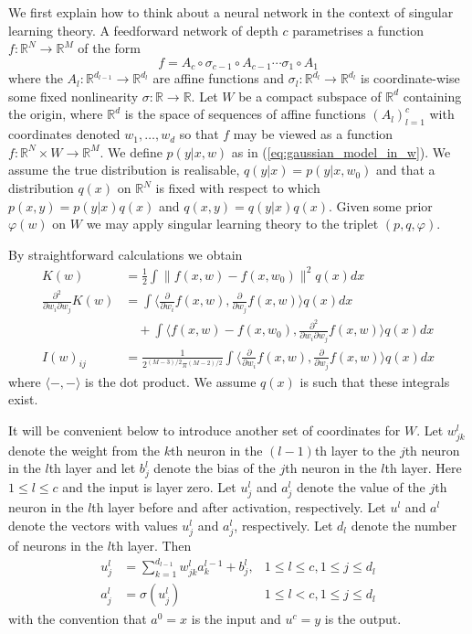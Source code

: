 \documentclass[11pt]{article}
\def\lto{\longrightarrow}
\numberwithin{equation}{section}
\theoremstyle{plain}
\theoremstyle{definition}
\begin{document}
We first explain how to think about a neural network in the context of singular learning theory. A feedforward network of depth $c$ parametrises a function $f: \mathbb{R}^N \lto \mathbb{R}^M$ of the form
\[
f = A_c \circ \sigma_{c-1} \circ A_{c-1} \cdots \sigma_1 \circ A_1
\]
where the $A_l: \mathbb{R}^{d_{l-1}} \lto \mathbb{R}^{d_{l}}$ are affine functions and $\sigma_l: \mathbb{R}^{d_{l}} \lto \mathbb{R}^{d_{l}}$ is coordinate-wise some fixed nonlinearity $\sigma: \mathbb{R} \lto \mathbb{R}$. Let $W$ be a compact subspace of $\mathbb{R}^d$ containing the origin, where $\mathbb{R}^d$ is the space of sequences of affine functions $(A_l)_{l=1}^c$ with coordinates denoted $w_1,\ldots,w_d$ so that $f$ may be viewed as a function $f: \mathbb{R}^N \times W \lto \mathbb{R}^M$. We define $p(y|x,w)$ as in (\ref{eq:gaussian_model_in_w}). We assume the true distribution is realisable, $q(y|x) = p(y|x,w_0)$ and that a distribution $q(x)$ on $\mathbb{R}^N$ is fixed with respect to which $p(x,y) = p(y|x)q(x)$ and $q(x,y) = q(y|x)q(x)$. Given some prior $\varphi(w)$ on $W$ we may apply singular learning theory to the triplet $(p,q,\varphi)$.

By straightforward calculations we obtain
\begin{align}
	K(w) &= \tfrac{1}{2} \int \| f(x,w) - f(x,w_0) \|^2 q(x) dx \label{eq:K_nn}\\
	\tfrac{\partial^2}{\partial w_i \partial w_j} K(w) &= \int \Big\langle \tfrac{\partial}{\partial w_i} f(x,w), \tfrac{\partial}{\partial w_j} f(x,w) \Big\rangle q(x) dx \nonumber \\
	&\quad + \int \Big\langle f(x,w) - f(x,w_0), \tfrac{\partial^2}{\partial w_i \partial w_j} f(x,w) \Big\rangle q(x) dx \label{eq:Hessian}\\
	I(w)_{ij} &= \frac{1}{2^{(M-3)/2} \pi^{(M-2)/2}} \int \Big\langle \tfrac{\partial}{\partial w_i} f(x,w), \tfrac{\partial}{\partial w_j} f(x,w) \Big\rangle q(x) dx\label{eq:fisher_relu}
\end{align}
where $\langle -, - \rangle$ is the dot product. We assume $q(x)$ is such that these integrals exist.

It will be convenient below to introduce another set of coordinates for $W$. Let $w_{jk}^{l}$ denote the weight from the $k$th neuron in the $(l-1)$th layer to the $j$th neuron in the $l$th layer and let $b_j^{l}$ denote the bias of the $j$th neuron in the $l$th layer. Here $1 \le l \le c$ and the input is layer zero. Let $u_{j}^{l}$ and $a_{j}^{l}$ denote the value of the $j$th neuron in the $l$th layer before and after activation, respectively. Let $u^{l}$ and $a^{l}$ denote the vectors with values $u_{j}^{l}$ and $a_{j}^{l}$, respectively. Let $d_{l}$ denote the number of neurons in the $l$th layer. Then
\begin{align*}
	u_{j}^{l} &=\sum_{k=1}^{d_{l-1}}w_{jk}^{l}a_{k}^{l-1}+b_{j}^{l}, &1 \le l \le c, 1 \le j \le d_l\\
	a_{j}^{l} &=\sigma(u_{j}^{l}) & 1 \le l < c, 1 \le j \le d_l
\end{align*}
with the convention that $a^0 = x$ is the input and $u^c = y$ is the output.
\end{document}
